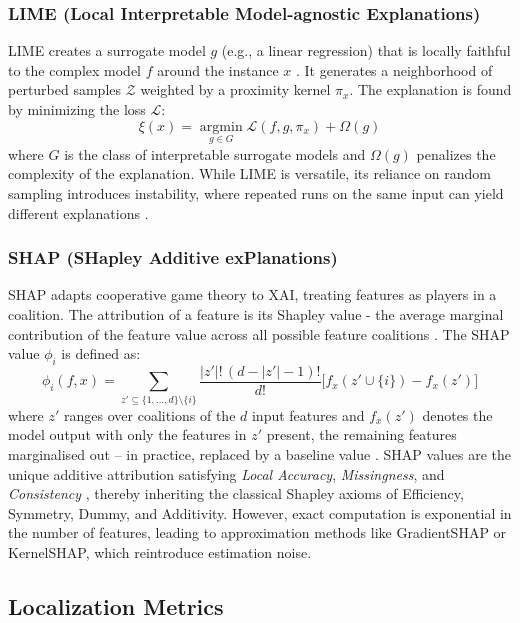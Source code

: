 \subsubsection{LIME (Local Interpretable Model-agnostic Explanations)}
LIME creates a surrogate model $g$ (e.g., a linear regression) that is locally faithful to the complex model $f$ around the instance $x$ \cite{ribeiro2016why}. It generates a neighborhood of perturbed samples $\mathcal{Z}$ weighted by a proximity kernel $\pi_x$. The explanation is found by minimizing the loss $\mathcal{L}$:
\begin{equation}
    \xi(x) = \operatorname*{argmin}_{g \in G} \mathcal{L}(f, g, \pi_x) + \Omega(g)
\end{equation}
where $G$ is the class of interpretable surrogate models and $\Omega(g)$ penalizes the complexity of the explanation. While LIME is versatile, its reliance on random sampling introduces instability, where repeated runs on the same input can yield different explanations \cite{hryniewska2024normensemblexai}.

\subsubsection{SHAP (SHapley Additive exPlanations)}
SHAP adapts cooperative game theory to XAI, treating features as players in a coalition. The attribution of a feature is its Shapley value - the average marginal contribution of the feature value across all possible feature coalitions \cite{lundberg2017unified}. The SHAP value $\phi_i$ is defined as:
\begin{equation}
    \phi_i(f, x) = \sum_{z' \subseteq \{1,\dots,d\} \setminus \{i\}} \frac{|z'|! \, (d - |z'| - 1)!}{d!} \bigl[f_x(z' \cup \{i\}) - f_x(z')\bigr]
\end{equation}
where $z'$ ranges over coalitions of the $d$ input features and $f_x(z')$ denotes the model output with only the features in $z'$ present, the remaining features marginalised out -- in practice, replaced by a baseline value \cite{lundberg2017unified}. SHAP values are the unique additive attribution satisfying \textit{Local Accuracy}, \textit{Missingness}, and \textit{Consistency} \cite{lundberg2017unified}, thereby inheriting the classical Shapley axioms of Efficiency, Symmetry, Dummy, and Additivity. However, exact computation is exponential in the number of features, leading to approximation methods like GradientSHAP or KernelSHAP, which reintroduce estimation noise.

\subsection{Localization Metrics}
\label{subsec:localization-metrics}


